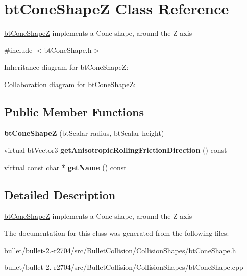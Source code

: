 \hypertarget{classbt_cone_shape_z}{\section{bt\+Cone\+Shape\+Z Class Reference}
\label{classbt_cone_shape_z}
}


\hyperlink{classbt_cone_shape_z}{bt\+Cone\+Shape\+Z} implements a Cone shape, around the Z axis  




{\ttfamily \#include $<$bt\+Cone\+Shape.\+h$>$}



Inheritance diagram for bt\+Cone\+Shape\+Z\+:


Collaboration diagram for bt\+Cone\+Shape\+Z\+:
\subsection*{Public Member Functions}
\begin{DoxyCompactItemize}
\item 
\hypertarget{classbt_cone_shape_z_a6974d856cbe1e0104133e68f07e92772}{{\bfseries bt\+Cone\+Shape\+Z} (bt\+Scalar radius, bt\+Scalar height)}\label{classbt_cone_shape_z_a6974d856cbe1e0104133e68f07e92772}

\item 
\hypertarget{classbt_cone_shape_z_ab8f7f10f8b5e3534f51135f7721ae281}{virtual bt\+Vector3 {\bfseries get\+Anisotropic\+Rolling\+Friction\+Direction} () const }\label{classbt_cone_shape_z_ab8f7f10f8b5e3534f51135f7721ae281}

\item 
\hypertarget{classbt_cone_shape_z_a78ef032e2084f678b5fc68eb4a36a8cd}{virtual const char $\ast$ {\bfseries get\+Name} () const }\label{classbt_cone_shape_z_a78ef032e2084f678b5fc68eb4a36a8cd}

\end{DoxyCompactItemize}


\subsection{Detailed Description}
\hyperlink{classbt_cone_shape_z}{bt\+Cone\+Shape\+Z} implements a Cone shape, around the Z axis 

The documentation for this class was generated from the following files\+:\begin{DoxyCompactItemize}
\item 
bullet/bullet-\/2.-\/r2704/src/\+Bullet\+Collision/\+Collision\+Shapes/bt\+Cone\+Shape.\+h\item 
bullet/bullet-\/2.-\/r2704/src/\+Bullet\+Collision/\+Collision\+Shapes/bt\+Cone\+Shape.\+cpp\end{DoxyCompactItemize}
